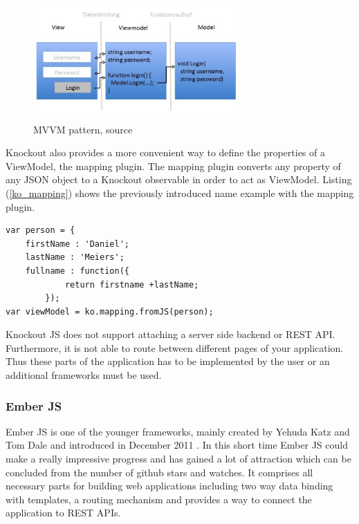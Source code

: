 \begin{figure}[h]
	\centering	
	\includegraphics[width=0.7\textwidth]{./img/tech-ana/mvvm.jpeg}
	\caption{MVVM pattern, source \autocite{heise_knockout}}
	\label{fig:mvvm}
\end{figure}

Knockout also provides a more convenient way to define the properties of a ViewModel, the mapping plugin.
The mapping plugin converts any property of any JSON object to a Knockout observable in order to act as ViewModel.
Listing (\ref{ko_mapping}) shows the previously introduced name example with the mapping plugin.

\begin{lstlisting}[label=ko_mapping,caption=the mapping plugin]
var person = {
	firstName : 'Daniel';
	lastName : 'Meiers';
	fullname : function({
			return firstname +lastName;
		});
var viewModel = ko.mapping.fromJS(person);
\end{lstlisting}

Knockout JS does not support attaching a server side backend or REST API.
Furthermore, it is not able to route between different pages of your application.
Thus these parts of the application has to be implemented by the user or an additional frameworks must be used.

\subsubsection{Ember JS}

Ember JS is one of the younger frameworks, mainly created by Yehuda Katz and Tom Dale and introduced in December 2011 \autocite{tech-ana:announcing-ember}.
In this short time Ember JS could make a really impressive progress and has gained a lot of attraction which can be concluded from the number of github stars and watches.
It comprises all necessary parts for building web applications including two way data binding with templates, a routing mechanism and provides a way to connect the application to REST APIs.


